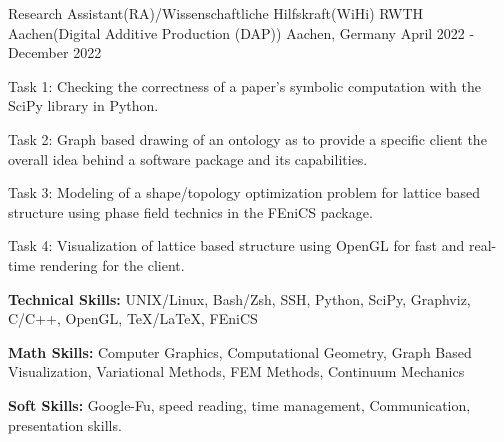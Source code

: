 

\begin{cventries}
  \cventry
    {Research Assistant(RA)/Wissenschaftliche Hilfskraft(WiHi)} %
    {RWTH Aachen(Digital Additive Production (DAP))} %
    {Aachen, Germany} %
    {April 2022 - December 2022} %
    {
      \begin{cvitems} %
      \item {Task 1: Checking the correctness of a paper's symbolic computation with the SciPy library in Python.}
      \item {Task 2: Graph based drawing of an ontology as to provide a specific client the overall idea behind a software package and its capabilities.}
      \item {Task 3: Modeling of a shape/topology optimization problem for lattice based structure using phase field technics in the FEniCS package.}
      \item {Task 4: Visualization of lattice based structure using OpenGL for fast and real-time rendering for the client.}
      \item {\textbf{Technical Skills:} UNIX/Linux, Bash/Zsh, SSH, Python, SciPy, Graphviz, C/C++, OpenGL, \TeX/\LaTeX, FEniCS}
      \item {\textbf{Math Skills:} Computer Graphics, Computational Geometry, Graph Based Visualization, Variational Methods, FEM Methods, Continuum Mechanics}
      \item {\textbf{Soft Skills:} Google-Fu, speed reading, time management, Communication, presentation skills.}
      \end{cvitems}
    }


\end{cventries}
